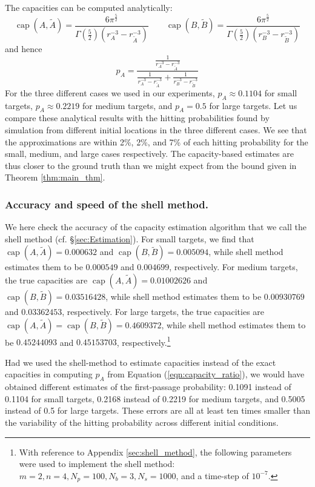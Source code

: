 \documentclass[12pt, nofootinbib,english, amsmath, amssymb, aps, priprint, graphicx,floatfix]{revtex4-1}
\theoremstyle{plain}
\theoremstyle{definition}
\theoremstyle{plain}
\newcommand{\capac}[2]{\ensuremath{\operatorname{cap}}(#1,#2)}
\newcommand{\tA}{{\tilde A}}
\newcommand{\tB}{{\tilde B}}
\begin{document}
The capacities can be computed analytically:
\begin{equation}
\label{eqn:analytic_capacities}
\capac{A}{\tA}  =
\frac{6\pi^{\frac{5}{2}}}
{\Gamma(\frac{5}{2})(r_A^{-3} - r_\tA^{-3})}  \qquad
\capac{B}{\tB}  =
\frac{6\pi^{\frac{5}{2}}}
{\Gamma(\frac{5}{2})(r_B^{-3} - r_\tB^{-3})}
\end{equation}
and hence
\begin{equation*}
p_A = \frac{\frac{1}{r_A^{-3} - r_{\tilde{A}}^{-3}}}{\frac{1}{r_A^{-3} - r_{\tilde{A}}^{-3}} + \frac{1}{r_B^{-3} - r_{\tilde{B}}^{-3}}}
\end{equation*}
For the three different cases we used in our experiments, $p_A \approx 0.1104$ for small targets, $p_A \approx 0.2219$ for medium targets, and $p_A = 0.5$ for large targets.  Let us compare these analytical results with the hitting probabilities found by simulation from different initial locations in the three different cases.  We see that the approximations are within 2\%, 2\%, and 7\% of each hitting probability for the small, medium, and large cases respectively.  The capacity-based estimates are thus closer to the ground truth than we might expect from the bound given in Theorem \ref{thm:main_thm}.  

\subsubsection{Accuracy and speed of the shell method.}
\label{sec:toy_shell}
We here check the accuracy of the capacity estimation algorithm that we call the shell method (cf. \S\ref{sec:Estimation}). For small targets, we find that $\capac{A}{\tA}=0.000632$ and $\capac{B}{\tB}=0.005094$, while shell method estimates them to be $0.000549$ and $0.004699$, respectively. For medium targets, the true capacities are $\capac{A}{\tA}=0.01002626$ and $\capac{B}{\tB}=0.03516428$, while shell method estimates them to be $0.00930769$ and $0.03362453$, respectively. For large targets, the true capacities are $\capac{A}{\tA}=\capac{B}{\tB}=0.4609372$, while shell method estimates them to be $0.45244093 $ and $0.45153703$, respectively.\footnote{With reference to Appendix \ref{sec:shell_method}, the following parameters were used to implement the shell method: $m = 2, n = 4, N_p = 100, N_b = 3, N_s = 1000$, and a time-step of $10^{-7}$.}

Had we used the shell-method to estimate capacities instead of the exact capacities in computing $p_A$ from Equation
(\ref{eqn:capacity_ratio}), we would have obtained different estimates of the first-passage probability: 0.1091 instead of 0.1104 for small targets, 0.2168 instead of 0.2219 for medium targets, and 0.5005 instead of 0.5 for large targets.  These errors are all at least ten times smaller than the variability of the hitting probability across different initial conditions.
\end{document}
